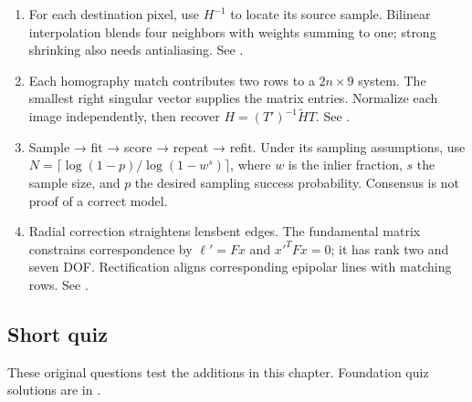 \documentclass[letterpaper,11pt,english,openany,oneside]{jupyterBook}
\begin{document}
\begin{enumerate}
\item {}
\sphinxAtStartPar
{} For each destination pixel, use \(H^{-1}\) to locate its source sample. Bilinear interpolation blends four neighbors with weights summing to one; strong shrinking also needs antialiasing. See {\hyperref[\detokenize{lectures/lecture02/warping:lec02-warping}]{}}.

\item {}
\sphinxAtStartPar
{} Each homography match contributes two rows to a \(2n\times9\) system. The smallest right singular vector supplies the matrix entries. Normalize each image independently, then recover \(H=(T')^{-1}\widetilde H T\). See {\hyperref[\detokenize{lectures/lecture02/estimation:lec02-estimation}]{}}.

\item {}
\sphinxAtStartPar
{} Sample → fit → score → repeat → refit. Under its sampling assumptions, use \(N=\lceil\log(1-p)/\log(1-w^s)\rceil\), where \(w\) is the inlier fraction, \(s\) the sample size, and \(p\) the desired sampling success probability. Consensus is not proof of a correct model.

\item {}
\sphinxAtStartPar
{} Radial correction straightens lens\sphinxhyphen{}bent edges. The fundamental matrix constrains correspondence by \(\ell'=Fx\) and \(x'^TFx=0\); it has rank two and seven DOF. Rectification aligns corresponding epipolar lines with matching rows. See {\hyperref[\detokenize{lectures/lecture02/two-view:lec02-two-view}]{}}.

\end{enumerate}


\subsection{Short quiz}
\label{\detokenize{lectures/lecture02/tldr:short-quiz}}
\sphinxAtStartPar
These original questions test the additions in this chapter. Foundation quiz solutions are in {\hyperref[\detokenize{lectures/lecture01/quiz-practice:lec01-quiz-practice}]{}}.
\end{document}
